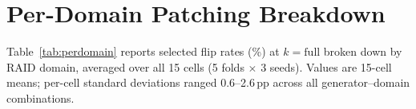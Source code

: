 \documentclass[11pt]{article}
\begin{document}
\begin{table}[!htbp]
\centering
{}
\caption{CAV diagnostics on per-generator stable sets. All values mean\,$\pm$\,std across 3 random seeds. Cosine: similarity between mean-difference CAV and L1 probe weight. LR acc: logistic-regression accuracy on the CAV projection. $\|\Delta\mu\|$: AI\,$-$\,human mean-difference norm (deterministic; bold\,=\,largest). $\|w\|$: L1 weight norm (bold\,=\,smallest).}
\label{tab:cav}
\end{table}

\section{Per-Domain Patching Breakdown}
\label{app:patching-perdomain}

Table~\ref{tab:perdomain} reports selected flip rates (\%) at $k = \text{full}$ broken down by RAID domain, averaged over all 15 cells (5 folds $\times$ 3 seeds). Values are 15-cell means; per-cell standard deviations ranged 0.6--2.6\,pp across all generator--domain combinations.
\end{document}
